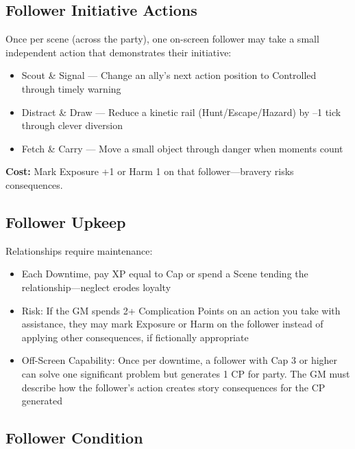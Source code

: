 \subsection*{Follower Initiative Actions}

Once per scene (across the party), one on-screen follower may take a small independent action that demonstrates their initiative:

\begin{itemize}
    \item Scout \& Signal --- Change an ally's next action position to Controlled through timely warning
    \item Distract \& Draw --- Reduce a kinetic rail (Hunt/Escape/Hazard) by –1 tick through clever diversion
    \item Fetch \& Carry --- Move a small object through danger when moments count
\end{itemize}

\textbf{Cost:} Mark Exposure +1 or Harm 1 on that follower—bravery risks consequences.

\subsection*{Follower Upkeep}

Relationships require maintenance:

\begin{itemize}
    \item Each Downtime, pay XP equal to Cap or spend a Scene tending the relationship—neglect erodes loyalty
    \item Risk: If the GM spends 2+ Complication Points on an action you take with assistance, they may mark Exposure or Harm on the follower instead of applying other consequences, if fictionally appropriate
    \item Off-Screen Capability: Once per downtime, a follower with Cap 3 or higher can solve one significant problem but generates 1 CP for party. The GM must describe how the follower's action creates story consequences for the CP generated
\end{itemize}

\subsection*{Follower Condition}

